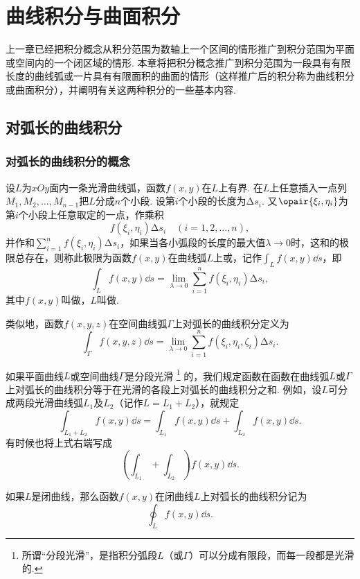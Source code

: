 \chapter{曲线积分与曲面积分}
上一章已经把积分概念从积分范围为数轴上一个区间的情形推广到积分范围为平面或空间内的一个闭区域的情形.
本章将把积分概念推广到积分范围为一段具有有限长度的曲线弧或一片具有有限面积的曲面的情形（这样推广后的积分称为曲线积分或曲面积分），并阐明有关这两种积分的一些基本内容.

\section{对弧长的曲线积分}
\subsection{对弧长的曲线积分的概念}
\begin{definition}
设\(L\)为\(xOy\)面内一条光滑曲线弧，函数\(f(x,y)\)在\(L\)上有界.
在\(L\)上任意插入一点列\(M_1,M_2,\dotsc,M_{n-1}\)把\(L\)分成\(n\)个小段.
设第\(i\)个小段的长度为\(\increment s_i\).
又\(\opair{\xi_i,\eta_i}\)为第\(i\)个小段上任意取定的一点，作乘积\[
f(\xi_i,\eta_i) \increment s_i \quad(i=1,2,\dotsc,n),
\]并作和\(\sum\limits_{i=1}^n f(\xi_i,\eta_i) \increment s_i\)，如果当各小弧段的长度的最大值\(\lambda\to0\)时，这和的极限总存在，则称此极限为函数\(f(x,y)\)在曲线弧\(L\)上或，记作\(\int_L f(x,y) \dd{s}\)，即\[
\int_L f(x,y) \dd{s}
= \lim\limits_{\lambda\to0} \sum\limits_{i=1}^n f(\xi_i,\eta_i) \increment s_i,
\]其中\(f(x,y)\)叫做，\(L\)叫做.

类似地，函数\(f(x,y,z)\)在空间曲线弧\(\Gamma\)上对弧长的曲线积分定义为\[
\int_{\Gamma} f(x,y,z) \dd{s}
=\lim\limits_{\lambda\to0} \sum\limits_{i=1}^n f(\xi_i,\eta_i,\zeta_i) \increment s_i.
\]

如果平面曲线\(L\)或空间曲线\(\Gamma\)是分段光滑%
\footnote{%
所谓“分段光滑”，是指积分弧段\(L\)（或\(\Gamma\)）可以分成有限段，而每一段都是光滑的.%
}%
的，我们规定函数在函数在曲线弧\(L\)或\(\Gamma\)上对弧长的曲线积分等于在光滑的各段上对弧长的曲线积分之和.
例如，设\(L\)可分成两段光滑曲线弧\(L_1\)及\(L_2\)（记作\(L=L_1+L_2\)），就规定
\[
\int_{L_1+L_2} f(x,y) \dd{s}
= \int_{L_1} f(x,y) \dd{s}
+ \int_{L_2} f(x,y) \dd{s}.
\]
有时候也将上式右端写成\[
\left( \int_{L_1} + \int_{L_2} \right) f(x,y) \dd{s}.
\]

如果\(L\)是闭曲线，那么函数\(f(x,y)\)在闭曲线\(L\)上对弧长的曲线积分记为\[
\oint_L f(x,y) \dd{s}.
\]
\end{definition}


